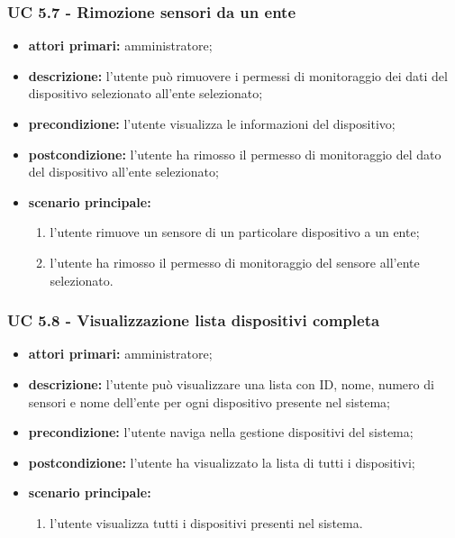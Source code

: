 			\subsubsection{UC 5.7 - Rimozione sensori da un ente}
			\begin{itemize}
				\item \textbf{attori primari:} amministratore;
				\item \textbf{descrizione:} l'utente può rimuovere i permessi di monitoraggio dei dati del dispositivo selezionato all'ente selezionato;
				\item \textbf{precondizione:} l'utente visualizza le informazioni del dispositivo;
				\item \textbf{postcondizione:} l'utente ha rimosso il permesso di monitoraggio del dato del dispositivo all'ente selezionato;
				\item \textbf{scenario principale:}
				\begin{enumerate}
					\item{l'utente rimuove un sensore di un particolare dispositivo a un ente;}
					\item{l'utente ha rimosso il permesso di monitoraggio del sensore all'ente selezionato.}
				\end{enumerate}
			\end{itemize}

			\subsubsection{UC 5.8 - Visualizzazione lista dispositivi completa}
			\begin{itemize}
				\item \textbf{attori primari:} amministratore;
				\item \textbf{descrizione:} l'utente può visualizzare una lista con ID, nome, numero di sensori e nome dell'ente per ogni dispositivo presente nel sistema;
				\item \textbf{precondizione:} l'utente naviga nella gestione dispositivi del sistema;
				\item \textbf{postcondizione:} l'utente ha visualizzato la lista di tutti i dispositivi;
				\item \textbf{scenario principale:}
				\begin{enumerate}
					\item{l'utente visualizza tutti i dispositivi presenti nel sistema.}
				\end{enumerate}
			\end{itemize}

